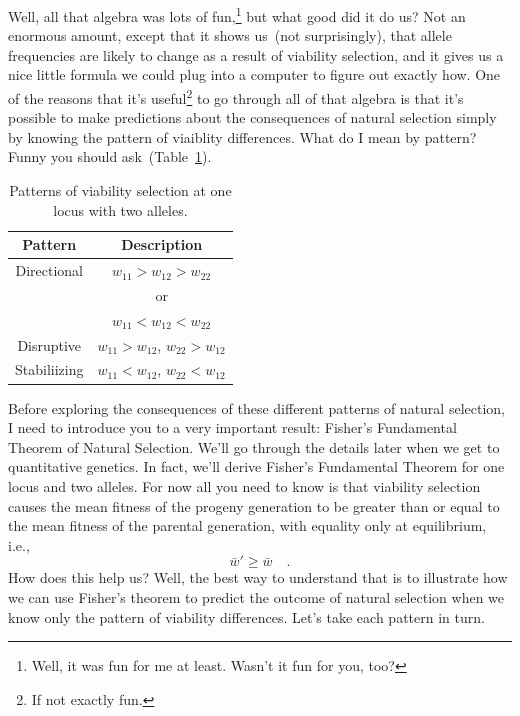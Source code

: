 \documentclass[12pt]{article}
\begin{document}
Well, all that algebra was lots of fun,\footnote{Well, it was fun for
  me at least. Wasn't it fun for you, too?} but what good did it do
us? Not an enormous amount, except that it shows us~(not
surprisingly), that allele frequencies are likely to change as a
result of viability selection, and it gives us a nice little formula
we could plug into a computer to figure out exactly how. One of the
reasons that it's useful\footnote{If not exactly fun.} to go through
all of that algebra is that it's possible to make predictions about
the consequences of natural selection simply by knowing the pattern of
viaiblity differences. What do I mean by pattern? Funny you should
ask~(Table~\ref{table:patterns}).

\begin{table}
\begin{center}
\begin{tabular}{cc}
\hline\hline
Pattern & Description \\
\hline
Directional & $w_{11} > w_{12} > w_{22}$ \\
            & or \\
            & $w_{11} < w_{12} < w_{22}$ \\
Disruptive  & $w_{11} > w_{12}$, $w_{22} > w_{12}$ \\
Stabiliizing& $w_{11} < w_{12}$, $w_{22} < w_{12}$ \\
\hline
\end{tabular}
\end{center}
\caption{Patterns of viability selection at one locus with two alleles.}\label{table:patterns}
\end{table}

Before exploring the consequences of these different patterns of
natural selection, I need to introduce you to a very important result:
Fisher's Fundamental Theorem of Natural Selection. We'll go through
the details later when we get to quantitative genetics. In fact, we'll
derive Fisher's Fundamental Theorem for one locus and two alleles. For
now all you need to know is that viability selection causes the mean
fitness of the progeny generation to be greater than or equal to the
mean fitness of the parental generation, with equality only at
equilibrium, i.e.,
\[
\bar w' \ge \bar w \quad .
\]
How does this help us? Well, the best way to understand that is to
illustrate how we can use Fisher's theorem to predict the outcome of
natural selection when we know only the pattern of viability
differences. Let's take each pattern in turn.
\end{document}

